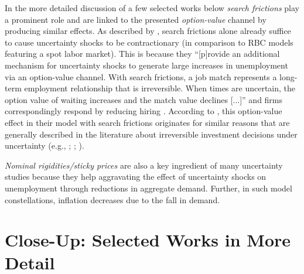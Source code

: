 \documentclass[a4paper,11pt,listof=nochaptergap,oneside,pointednumbers,bibtotoc,bigheadings,liststotoc,hidelinks]{scrbook}
\theoremstyle{mysatz}
\theoremstyle{mydefinition}
\theoremstyle{mytheorem}
\theoremstyle{mybemerkung}
\begin{document}
In the more detailed discussion of a few selected works below \textit{search frictions} play a prominent role and are linked to the presented \textit{option-value} channel by producing similar effects. As described by \citet{leducandliu:16}, search frictions alone already suffice to cause uncertainty shocks to be contractionary (in comparison to RBC models featuring a spot labor market). This is because they ``[p]rovide an additional mechanism for uncertainty shocks to generate large increases in unemployment via an option-value channel. With search frictions, a job match represents a long-term employment relationship that is irreversible. When times are uncertain, the option value of waiting increases and the match value declines [...]'' and firms correspondingly respond by reducing hiring \citep[p. 2]{leducandliu:16}. According to \citet{leducandliu:16}, this option-value effect in their model with search frictions originates for similar reasons that are generally described in the literature about irreversible investment decisions under uncertainty (e.g., \citealp{bernanke:83}; \citealp{bloom:09}; \citealp{bloometal:12}).

\textit{Nominal rigidities/sticky prices} are also a key ingredient of many uncertainty studies because they help aggravating the effect of uncertainty shocks on unemployment through reductions in aggregate demand. Further, in such model constellations, inflation decreases due to the fall in demand.


\section[Close-Up: Selected Works in More Detail]{Close-Up: Selected Works in More Detail}
\label{sec:selectedworkindetail}
\end{document}
